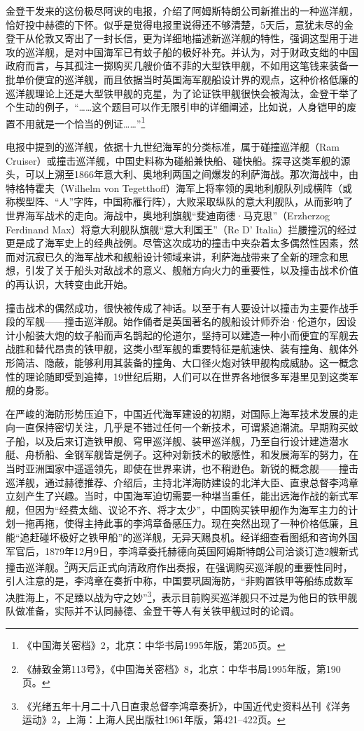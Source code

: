 \documentclass[12pt,UTF8]{ctexbook}
\begin{document}
金登干发来的这份极尽阿谀的电报，介绍了阿姆斯特朗公司新推出的一种巡洋舰，恰好投中赫德的下怀。似乎是觉得电报里说得还不够清楚，5天后，意犹未尽的金登干从伦敦又寄出了一封长信，更为详细地描述新巡洋舰的特性，强调这型用于进攻的巡洋舰，是对中国海军已有蚊子船的极好补充。并认为，对于财政支绌的中国政府而言，与其孤注一掷购买几艘价值不菲的大型铁甲舰，不如用这笔钱来装备一批单价便宜的巡洋舰，而且依据当时英国海军舰船设计界的观点，这种价格低廉的巡洋舰理论上还是大型铁甲舰的克星，为了论证铁甲舰很快会被淘汰，金登干举了个生动的例子，“……这个题目可以作无限引申的详细阐述，比如说，人身铠甲的废置不用就是一个恰当的例证……”\footnote{《中国海关密档》2，北京：中华书局1995年版，第205页。}

电报中提到的巡洋舰，依据十九世纪海军的分类标准，属于碰撞巡洋舰（Ram Cruiser）或撞击巡洋舰，中国史料称为碰船兼快船、碰快船。探寻这类军舰的源头，可以上溯至1866年意大利、奥地利两国之间爆发的利萨海战。那次海战中，由特格特霍夫（Wilhelm von Tegetthoff）海军上将率领的奥地利舰队列成横阵（或称楔型阵、“人”字阵，中国称雁行阵），大败采取纵队的意大利舰队，从而影响了世界海军战术的走向。海战中，奥地利旗舰“斐迪南德·马克思”（Erzherzog Ferdinand Max）将意大利舰队旗舰“意大利国王”（Re D' Italia）拦腰撞沉的经过更是成了海军史上的经典战例。尽管这次成功的撞击中夹杂着太多偶然性因素，然而对沉寂已久的海军战术和舰船设计领域来讲，利萨海战带来了全新的理念和思想，引发了关于船头对敌战术的意义、舰艏方向火力的重要性，以及撞击战术价值的再认识，大转变由此开始。

撞击战术的偶然成功，很快被传成了神话。以至于有人要设计以撞击为主要作战手段的军舰——撞击巡洋舰。始作俑者是英国著名的舰船设计师乔治·伦道尔，因设计小船装大炮的蚊子船而声名鹊起的伦道尔，坚持可以建造一种小而便宜的军舰去战胜和替代昂贵的铁甲舰，这类小型军舰的重要特征是航速快、装有撞角、舰体外形简洁、隐蔽，能够利用其装备的撞角、大口径火炮对铁甲舰构成威胁。这一概念性的理论随即受到追捧，19世纪后期，人们可以在世界各地很多军港里见到这类军舰的身影。

在严峻的海防形势压迫下，中国近代海军建设的初期，对国际上海军技术发展的走向一直保持密切关注，几乎是不错过任何一个新技术，可谓紧追潮流。早期购买蚊子船，以及后来订造铁甲舰、穹甲巡洋舰、装甲巡洋舰，乃至自行设计建造潜水艇、舟桥船、全钢军舰皆是例子。这种对新技术的敏感性，和发展海军的努力，在当时亚洲国家中遥遥领先，即使在世界来讲，也不稍逊色。新锐的概念舰——撞击巡洋舰，通过赫德推荐、介绍后，主持北洋海防建设的北洋大臣、直隶总督李鸿章立刻产生了兴趣。当时，中国海军迫切需要一种堪当重任，能出远海作战的新式军舰，但因为“经费太绌、议论不齐、将才太少”，中国购买铁甲舰作为海军主力的计划一拖再拖，使得主持此事的李鸿章备感压力。现在突然出现了一种价格低廉，且能“追赶碰坏极好之铁甲船”的巡洋舰，无异天赐良机。经详细查看图纸和咨询外国军官后，1879年12月9日，李鸿章委托赫德向英国阿姆斯特朗公司洽谈订造2艘新式撞击巡洋舰。\footnote{《赫致金第113号》，《中国海关密档》8，北京：中华书局1995年版，第190页。}两天后正式向清政府作出奏报，在强调购买巡洋舰的重要性同时，引人注意的是，李鸿章在奏折中称，中国要巩固海防，“非购置铁甲等船练成数军决胜海上，不足臻以战为守之妙”\footnote{《光绪五年十月二十八日直隶总督李鸿章奏折》，中国近代史资料丛刊《洋务运动》2，上海：上海人民出版社1961年版，第421--422页。}，表示目前购买巡洋舰只不过是为他日的铁甲舰队做准备，实际并不认同赫德、金登干等人有关铁甲舰过时的论调。
\end{document}
